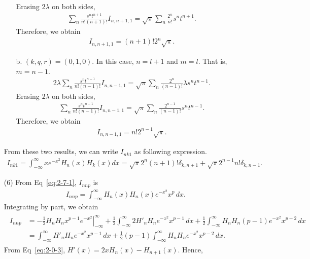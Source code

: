 \documentclass[floatfix,nofootinbib,superscriptaddress,fleqn]{revtex4-2}
\begin{document}
\begin{itemize}
\begin{itemize}
  Erasing $2\lambda$ on both sides,
  \begin{align}
    \sum_n \frac{s^n t^{n+1}}{n!(n+1)!}I_{n,n+1,1}
    =\sqrt{\pi}\sum_{n}\frac{2^{n}}{n!} s^n t^{n+1}.
  \end{align}
  Therefore, we obtain
  \begin{align}
    I_{n,n+1,1} = (n+1)!2^n\sqrt{\pi}.
  \end{align}
  \item[b. ]$(k,q,r) = (0, 1, 0)$.
  In this case, $n=l+1$ and $m=l$. That is, $m=n-1$.
  \begin{align}
    2\lambda\sum_n \frac{s^n t^{n-1}}{n!(n-1)!}I_{n,n-1,1}
    =\sqrt{\pi}\sum_{n}\frac{2^{n}}{(n-1)!}\lambda s^n t^{n-1}.
  \end{align}
  Erasing $2\lambda$ on both sides,
  \begin{align}
    \sum_n \frac{s^n t^{n-1}}{n!(n-1)!}I_{n,n-1,1}
    =\sqrt{\pi}\sum_{n}\frac{2^{n-1}}{(n-1)!}s^n t^{n-1}.
  \end{align}
  Therefore, we obtain
  \begin{align}
    I_{n,n-1,1} = n!2^{n-1}\sqrt{\pi}.
  \end{align}
\end{itemize}
From these two results, we can write $I_{nk1}$ as following expression.
\begin{align}
  I_{nk1}=\int_{-\infty}^\infty x e^{-x^2} H_n(x) H_k(x) dx 
  = \sqrt{\pi} 2^n (n+1)! \delta_{k,n+1}
  +\sqrt{\pi}
  2^{n-1} n!\delta_{k,n-1}.
\end{align}
\item[(6)] From Eq~\eqref{eq:2-7-1}, $I_{nnp}$ is
\begin{align}
  I_{nnp} = \int^{\infty}_{-\infty}H_n(x)H_n(x)e^{-x^2}x^p\,dx.
\end{align}
Integrating by part, we obtain
\begin{align}
  \begin{split}
    I_{nnp} &= \left.-\frac{1}{2}H_nH_n x^{p-1}e^{-x^2}\right|^{\infty}_{-\infty}
    +\frac{1}{2}\int^{\infty}_{-\infty}2H'_n H_n e^{-x^2}x^{p-1}\,dx
    +\frac{1}{2}\int^{\infty}_{-\infty}H_n H_n (p-1)e^{-x^2}x^{p-2}\,dx \\
    &=\int^{\infty}_{-\infty}H'_n H_n e^{-x^2}x^{p-1}\,dx
    +\frac{1}{2}(p-1)\int^{\infty}_{-\infty}H_n H_n e^{-x^2}x^{p-2}\,dx.
  \end{split}
\end{align}
From Eq~\eqref{eq:2-0-3}, $H'(x) = 2xH_{n}(x)-H_{n+1}(x)$. Hence,
\begin{align}

\end{align}
\end{itemize}
\end{document}
